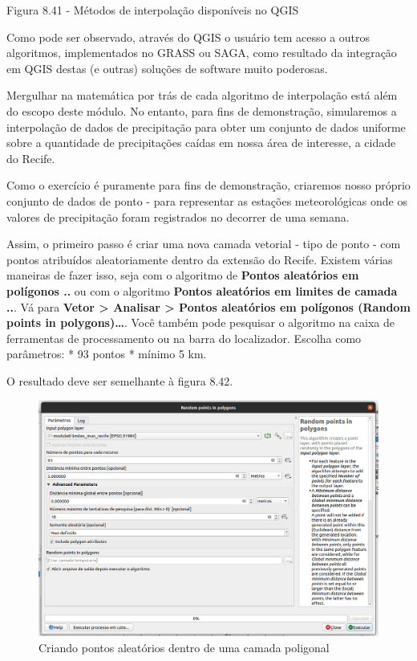 \documentclass[
]{krantz}
\begin{document}
Figura 8.41 - Métodos de interpolação disponíveis no QGIS

Como pode ser observado, através do QGIS o usuário tem acesso a outros algoritmos, implementados no GRASS ou SAGA, como resultado da integração em QGIS destas (e outras) soluções de software muito poderosas.

Mergulhar na matemática por trás de cada algoritmo de interpolação está além do escopo deste módulo. No entanto, para fins de demonstração, simularemos a interpolação de dados de precipitação para obter um conjunto de dados uniforme sobre a quantidade de precipitações caídas em nossa área de interesse, a cidade do Recife.

Como o exercício é puramente para fins de demonstração, criaremos nosso próprio conjunto de dados de ponto - para representar as estações meteorológicas onde os valores de precipitação foram registrados no decorrer de uma semana.

Assim, o primeiro passo é criar uma nova camada vetorial - tipo de ponto - com pontos atribuídos aleatoriamente dentro da extensão do Recife. Existem várias maneiras de fazer isso, seja com o algoritmo de \textbf{Pontos aleatórios em polígonos ..} ou com o algoritmo \textbf{Pontos aleatórios em limites de camada ..}. Vá para \textbf{Vetor \textgreater{} Analisar \textgreater{} Pontos aleatórios em polígonos (Random points in polygons)\ldots{}}. Você também pode pesquisar o algoritmo na caixa de ferramentas de processamento ou na barra do localizador. Escolha como parâmetros:
* 93 pontos
* mínimo 5 km.

O resultado deve ser semelhante à figura 8.42.

\begin{figure}
\centering
\includegraphics{media/modulo8/fig842.png}
\caption{Criando pontos aleatórios dentro de uma camada poligonal}
\end{figure}
\end{document}
